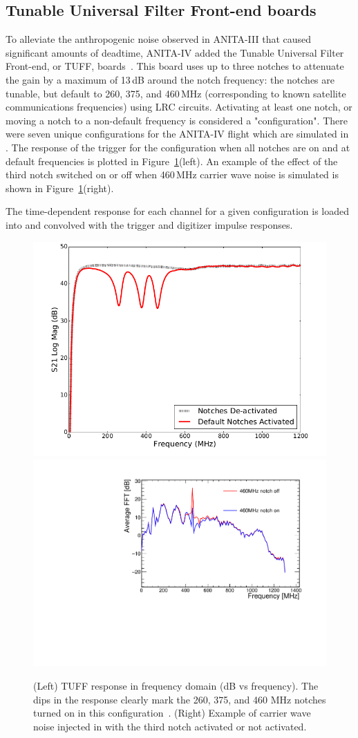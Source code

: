 \subsection{Tunable Universal Filter Front-end boards}
\label{subsec:tuffs}
To alleviate the anthropogenic noise observed in ANITA-III that caused
significant amounts of deadtime, ANITA-IV added the Tunable Universal
Filter Front-end, or TUFF, boards~\cite{Allison:2017vtk}.
This board uses up to three notches to attenuate
the gain by a maximum of 13\,dB around the notch
frequency:
the notches are tunable, but default to 260, 375, and 460\,MHz  (corresponding to known satellite communications frequencies) using LRC circuits. Activating at least one notch, or moving a notch to a non-default frequency is considered a "configuration". There were seven unique configurations for the ANITA-IV flight  which are simulated in 
\icemc. 
The response of the trigger for the configuration when all notches are on and at default frequencies is plotted in Figure~\ref{fig:TUFFs}(left). 
An example of the effect of the third notch switched on or off when 460\,MHz carrier wave noise is simulated is shown in Figure~\ref{fig:TUFFs}(right).

The time-dependent response for each channel for a given configuration is loaded into \icemc and convolved with the trigger and digitizer impulse responses. 

\begin{figure}
  \centering
 \includegraphics[width=0.45\linewidth] {./Figs/config_P_response_freq.png} 
 \includegraphics[width=0.45\linewidth] {./Figs/Icemc_tuffs.pdf} 
  \caption{(Left) TUFF response in frequency domain (dB vs frequency). The dips in the response clearly mark the 260, 375, and 460 MHz notches turned on in this configuration~\cite{Allison:2017vtk}.
  (Right) Example of carrier wave noise injected in \icemc with the third notch activated or not activated.}
\label{fig:TUFFs}
\end{figure}


